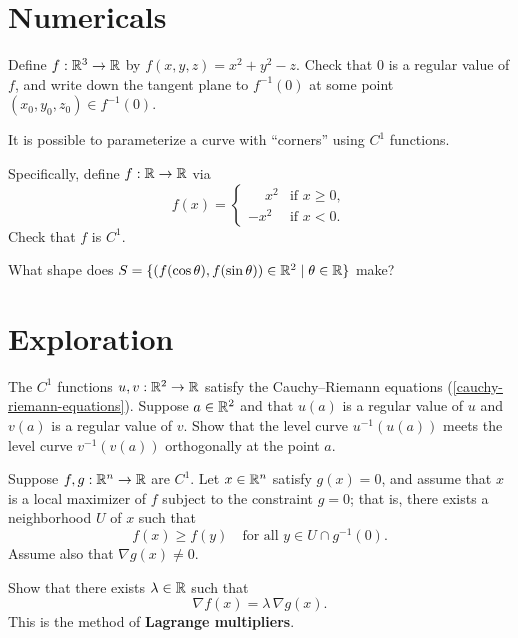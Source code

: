 \documentclass{homework}
\begin{document}
\section{Numericals}

\begin{problem}
  Define $f : \mathbb{R}^3 \to \mathbb{R}$ by $f(x,y,z)=x^2+y^2-z$. Check that $0$ is a regular value of $f$, and write down the tangent plane to $f^{-1}(0)$ at some point $(x_0,y_0,z_0) \in f^{-1}(0)$.
\end{problem}

\begin{problem}\label{parameterize-corners}%
  It is possible to parameterize a curve with ``corners'' using $C^1$ functions.

  Specifically, define $f : \mathbb{R} \to \mathbb{R}$ via
  \[
    f(x) = \begin{cases}
      \phantom{-}x^2 & \text{if } x \geq 0, \\
      -x^2 & \text{if }x < 0.
      \end{cases}
    \]
    Check that $f$ is $C^1$.

    What shape does $S = \{ \left(f(\cos \theta), f(\sin \theta)\right)  \in \mathbb{R}^2 \mid \theta \in \mathbb{R} \}$ make?
\end{problem}


\section{Exploration}

\begin{problem}
The $C^1$ functions $u,v:\mathbb{R}^2\to\mathbb{R}$ satisfy the Cauchy--Riemann equations (\ref{cauchy-riemann-equations}). Suppose $a \in \mathbb{R}^2$ and that $u(a)$ is a regular value of $u$ and $v(a)$ is a regular value of $v$. Show that the level curve $u^{-1}(u(a))$ meets the level curve $v^{-1}(v(a))$ orthogonally at the point $a$.
\end{problem}

\begin{problem}\label{lagrange-multipliers}%
Suppose $f,g:\mathbb{R}^n\to\mathbb{R}$ are $C^{1}$. Let $x\in\mathbb{R}^n$ satisfy $g(x)=0$, and assume
that $x$ is a local maximizer of $f$ subject to the constraint $g=0$; that is,
there exists a neighborhood $U$ of $x$ such that
\[
f(x)\ge f(y)\quad\text{for all }y\in U\cap g^{-1}(0).
\]
Assume also that $\nabla g(x)\neq 0$.

Show that there exists $\lambda\in\mathbb{R}$ such that
\[
\nabla f(x)=\lambda\,\nabla g(x).
\]
This is the method of \textbf{Lagrange multipliers}.
\end{problem}
\end{document}
